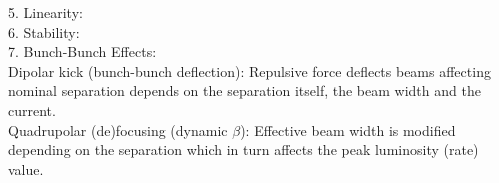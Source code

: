 5. Linearity: \\

6. Stability:  \\

7. Bunch-Bunch Effects: \\

Dipolar kick (bunch-bunch deflection): Repulsive force deflects beams affecting nominal separation depends on the separation itself, the beam width and the current. \\
 
 Quadrupolar (de)focusing (dynamic $\beta$): Effective beam width is modified depending on the separation which in turn affects the peak luminosity (rate) value. \cite{CMS-PAS-LUM-18-002} \\

